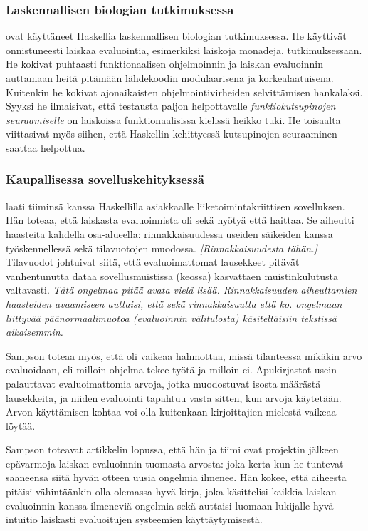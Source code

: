 \subsubsection{Laskennallisen biologian tutkimuksessa}\label{sec:superscience}

\citet{daniels2012experience} ovat käyttäneet Haskellia laskennallisen biologian tutkimuksessa. He käyttivät onnistuneesti laiskaa evaluointia, esimerkiksi laiskoja monadeja, tutkimuksessaan. He kokivat puhtaasti funktionaalisen ohjelmoinnin ja laiskan evaluoinnin auttamaan heitä pitämään lähdekoodin modulaarisena ja korkealaatuisena. Kuitenkin he kokivat ajonaikaisten ohjelmointivirheiden selvittämisen hankalaksi. Syyksi he ilmaisivat, että testausta paljon helpottavalle \textit{funktiokutsupinojen seuraamiselle} on laiskoissa funktionaalisissa kielissä heikko tuki. He toisaalta viittasivat myös siihen, että Haskellin kehittyessä kutsupinojen seuraaminen saattaa helpottua.

\subsubsection{Kaupallisessa sovelluskehityksessä}

\citet{sampson2009experience} laati tiiminsä kanssa Haskellilla asiakkaalle liiketoimintakriittisen sovelluksen. Hän toteaa, että laiskasta evaluoinnista oli sekä hyötyä että haittaa. Se aiheutti haasteita kahdella osa-alueella: rinnakkaisuudessa useiden säikeiden kanssa työskennellessä sekä tilavuotojen muodossa. \textit{[Rinnakkaisuudesta tähän.]} Tilavuodot johtuivat siitä, että evaluoimattomat lausekkeet pitävät vanhentunutta dataa sovellusmuistissa (keossa) kasvattaen muistinkulutusta valtavasti. \textit{Tätä ongelmaa pitää avata vielä lisää. Rinnakkaisuuden aiheuttamien haasteiden avaamiseen auttaisi, että sekä rinnakkaisuutta että ko. ongelmaan liittyvää päänormaalimuotoa (evaluoinnin välitulosta) käsiteltäisiin tekstissä aikaisemmin.}

Sampson toteaa myös, että oli vaikeaa hahmottaa, missä tilanteessa mikäkin arvo evaluoidaan, eli milloin ohjelma tekee työtä ja milloin ei. Apukirjastot usein palauttavat evaluoimattomia arvoja, jotka muodostuvat isosta määrästä lausekkeita, ja niiden evaluointi tapahtuu vasta sitten, kun arvoja käytetään. Arvon käyttämisen kohtaa voi olla kuitenkaan kirjoittajien mielestä vaikeaa löytää.

Sampson toteavat artikkelin lopussa, että hän ja tiimi ovat projektin jälkeen epävarmoja laiskan evaluoinnin tuomasta arvosta: joka kerta kun he tuntevat saaneensa siitä hyvän otteen uusia ongelmia ilmenee. Hän kokee, että aiheesta pitäisi vähintäänkin olla olemassa hyvä kirja, joka käsittelisi kaikkia laiskan evaluoinnin kanssa ilmeneviä ongelmia sekä auttaisi luomaan lukijalle hyvä intuitio laiskasti evaluoitujen systeemien käyttäytymisestä.

